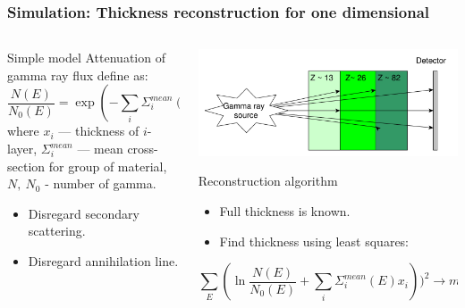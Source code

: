 \documentclass[11pt]{beamer}
\begin{document}
    \begin{frame}
    \frametitle{Simulation: Thickness reconstruction for one dimensional}
    \begin{columns}
        \begin{column}{0.4\textwidth}
            \begin{block}{Simple model}
                Attenuation of gamma ray flux define as:
                                        $$
                \frac{N(E)}{N_0(E)} = \exp(-\sum_i \Sigma^{mean}_i(E)x_i)
                $$
                where $x_i$ --- thickness of $i$-layer, $\Sigma^{mean}_i$ --- mean cross-section for group of material, $N,~N_0$ - number of gamma.
                \begin{itemize}
                    \item Disregard secondary scattering.
                    \item Disregard annihilation line.
                \end{itemize}

                   
            \end{block}

        \end{column}
        \begin{column}{0.55\textwidth}
                  \includegraphics[width=1\textwidth]{figures/yed_schema_2.pdf}
                \begin{block}{Reconstruction algorithm}
                    \begin{itemize}
                        \item Full thickness is known.
                        \item Find thickness using least squares:                  
                        
                    \end{itemize}
                    $$
                    \sum_E(\ln \frac{N(E)}{N_0(E)} + \sum_i \Sigma^{mean}_i(E)x_i))^2 \to min
                    $$
                \end{block}


        \end{column}
    \end{columns}  
\end{frame}
\end{document}
